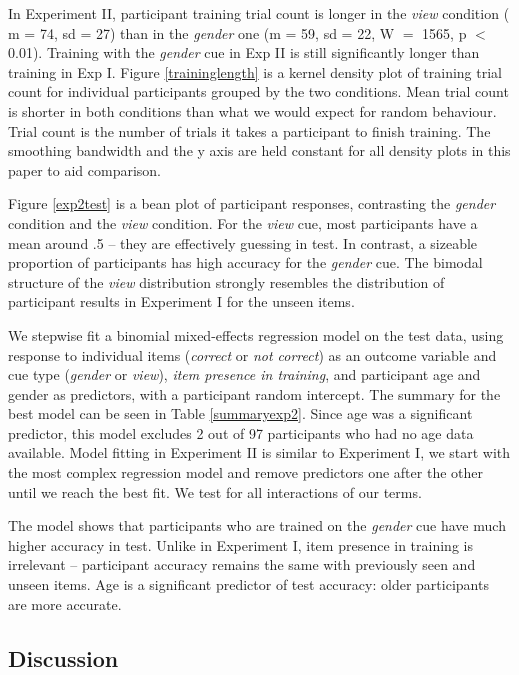 \documentclass{frontiersSCNS} %
\begin{document}
In Experiment II, participant training trial count is longer in the \emph{view} condition ( m = 74, sd = 27) than in the \emph{gender} one (m = 59, sd = 22, W $=$ 1565, p $<$ 0.01). Training with the \emph{gender} cue in Exp II is still significantly longer than training in Exp I. Figure \ref{traininglength} is a kernel density plot of training trial count for individual participants grouped by the two conditions. Mean trial count is shorter in both conditions than what we would expect for random behaviour. Trial count is the number of trials it takes a participant to finish training. The smoothing bandwidth and the y axis are held constant for all density plots in this paper to aid comparison.

Figure \ref{exp2test} is a bean plot of participant responses, contrasting the \emph{gender} condition and the \emph{view}
condition. For the \emph{view} cue, most participants have a mean around .5 -- they are effectively guessing in test. In contrast, a sizeable proportion of participants has high accuracy for the \emph{gender} cue. The bimodal structure of the \emph{view} distribution strongly resembles the distribution of participant results in Experiment I for the unseen items.

We stepwise fit a binomial mixed-effects regression model on the test data, using response to individual items (\emph{correct} or \emph{not correct}) as an outcome variable and cue type (\emph{gender} or \emph{view}), \emph{item presence in training}, and participant age and gender as predictors, with a participant random intercept. The summary for the best model can be seen in Table \ref{summaryexp2}. Since age was a significant predictor, this model excludes 2 out of 97 participants who had no age data available. Model fitting in Experiment II is similar to Experiment I, we start with the most complex regression model and remove predictors one after the other until we reach the best fit. We test for all interactions of our terms.

The model shows that participants who are trained on the \emph{gender} cue have much higher accuracy in test. Unlike in Experiment I, item presence in training is irrelevant -- participant accuracy remains the same with previously seen and unseen items. Age is a significant predictor of test accuracy: older participants are more accurate.

\subsection{Discussion \label{adaptivetracking}}
\end{document}
